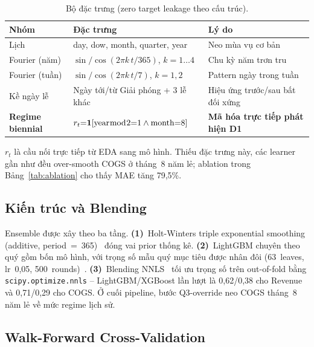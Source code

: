 \documentclass{article}
\begin{document}
\begin{table}[H]
  \vspace{-2pt}
  \caption{Bộ đặc trưng (zero target leakage theo cấu trúc).}
  \label{tab:features}
  \centering
  \small
  \setlength{\tabcolsep}{4pt}
  \begin{tabularx}{\linewidth}{@{} l l X @{}}
    \toprule
    \textbf{Nhóm} & \textbf{Đặc trưng} & \textbf{Lý do} \\
    \midrule
    Lịch
      & day, dow, month, quarter, year
      & Neo mùa vụ cơ bản \\
    Fourier (năm)
      & $\sin/\cos(2\pi k\,t/365)$, $k{=}1\ldots4$
      & Chu kỳ năm trơn tru~\cite{alexandrov2020gluonts} \\
    Fourier (tuần)
      & $\sin/\cos(2\pi k\,t/7)$, $k{=}1,2$
      & Pattern ngày trong tuần \\
    Kề ngày lễ
      & Ngày tới/từ Giải phóng + 3 lễ khác
      & Hiệu ứng trước/sau bất đối xứng \\
    \textbf{Regime biennial}
      & $r_t{=}\mathbf{1}[\text{year}{\bmod}2{=}1 \wedge \text{month}{=}8]$
      & \textbf{Mã hóa trực tiếp phát hiện D1} \\
    \bottomrule
  \end{tabularx}
  \vspace{-4pt}
\end{table}

$r_t$ là cầu nối trực tiếp từ EDA sang mô hình. Thiếu đặc trưng này, các
learner gần như đều over-smooth COGS ở tháng~8 năm lẻ; ablation trong
Bảng~\ref{tab:ablation} cho thấy MAE tăng 79,5\%.

\subsection{Kiến trúc và Blending}
\label{sec:architecture}

Ensemble được xây theo ba tầng. \textbf{(1)}~Holt-Winters triple exponential
smoothing (additive, period~=~365)~\cite{winters1960forecasting} đóng vai prior
thống kê. \textbf{(2)}~LightGBM chuyên theo quý gồm bốn mô hình, với trọng số
mẫu quý mục tiêu được nhân đôi (63~leaves, lr~0,05, 500~rounds)~\cite{ke2017lightgbm}.
\textbf{(3)}~Blending NNLS~\cite{lawson1995nnls} tối ưu trọng số trên
out-of-fold bằng \texttt{scipy.optimize.nnls} -- LightGBM/XGBoost lần lượt là
0,62/0,38 cho Revenue và 0,71/0,29 cho COGS. Ở cuối pipeline, bước Q3-override
neo COGS tháng~8 năm lẻ về mức regime lịch sử.

\subsection{Walk-Forward Cross-Validation}
\label{sec:cv}
\end{document}
